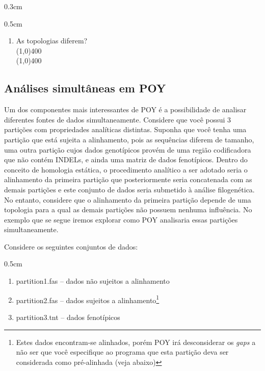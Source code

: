 \begin{refsection}
\begin {myindentpar}{0.3cm}
\begin{enumerate}[\itshape i.]
\begin {myindentpar}{0.5cm}
\begin{enumerate}[\itshape a.]
	\item{As topologias diferem?}\\
		\line(1,0){400}\\
		\line(1,0){400}\\

	\end{enumerate}
	\end{myindentpar}

\end{enumerate}
\end{myindentpar}


\subsection{Análises simultâneas em POY}\label{tut9:context:partitions}

Um dos componentes mais interessantes de POY é a possibilidade de analisar diferentes fontes de dados simultaneamente. Considere que você possui 3 partições com propriedades analíticas distintas. Suponha que você tenha uma partição que está sujeita a alinhamento, pois as sequências diferem de tamanho, uma outra partição cujos dados genotípicos provém de uma região codificadora que não contém INDELs, e ainda uma matriz de dados fenotípicos. Dentro do conceito de homologia estática, o procedimento analítico a ser adotado seria o alinhamento da primeira partição que posteriormente seria concatenada com as demais partições e este conjunto de dados seria submetido à análise filogenética. No entanto, considere que o alinhamento da primeira partição depende de uma topologia para a qual as demais partições não possuem nenhuma influência. No exemplo que se segue iremos explorar como POY analisaria essas partições simultaneamente.

	Considere os seguintes conjuntos de dados:

\begin {myindentpar}{0.5cm}
\begin{enumerate}[\itshape 1.]

	\item{partition1.fas -- dados não sujeitos a alinhamento}
	\item{partition2.fas -- dados sujeitos a alinhamento\footnote{ Estes dados encontram-se alinhados, porém POY irá desconsiderar os \textit{gaps} a não ser que você especifique ao programa que esta partição deva ser considerada como pré-alinhada (veja abaixo)}}
	\item{partition3.tnt -- dados fenotípicos}


\end{enumerate}
\end{myindentpar}
\end{refsection}
